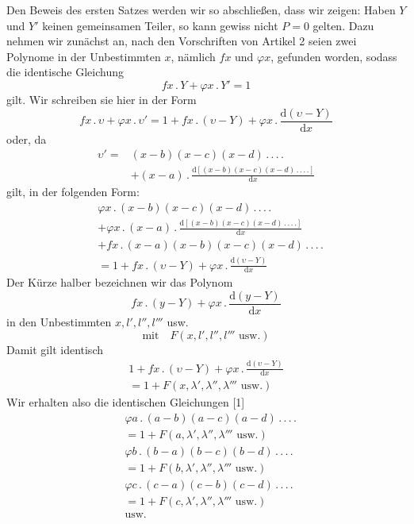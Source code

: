 Den Beweis des ersten Satzes werden wir so abschließen, dass wir zeigen: Haben $Y$ und $Y'$ keinen gemeinsamen Teiler, so kann gewiss nicht $P=0$ gelten. Dazu nehmen wir zunächst an, nach den Vorschriften von Artikel 2 seien zwei Polynome in der Unbestimmten $x$, nämlich $fx$ und $\varphi x$, gefunden worden, sodass die identische Gleichung
\[
fx\, .\,Y+\varphi x\, .\,Y'=1
\]
gilt. Wir schreiben sie hier in der Form
\[
fx\, .\,\upsilon+\varphi x\, .\,\upsilon'=1+fx\, .\,(\upsilon-Y)+\varphi x\, .\,\frac{\mathrm d(\upsilon-Y)}{\mathrm dx}
\]
oder, da
\[
\begin{aligned}
\upsilon'={}&(x-b)(x-c)(x-d)\, .\, .\, .\, .\\
&+(x-a)\, .\,\frac{\mathrm d[(x-b)(x-c)(x-d)\, .\, .\, .\, .]}{\mathrm dx}
\end{aligned}
\]
gilt, in der folgenden Form:
\[
\begin{aligned}
&\varphi x\, .\,(x-b)(x-c)(x-d)\, .\, .\, .\, .\\
&+\varphi x\, .\,(x-a)\, .\,\frac{\mathrm d[(x-b)(x-c)(x-d)\, .\, .\, .\, .]}{\mathrm dx}\\
&+fx\, .\,(x-a)(x-b)(x-c)(x-d)\, .\, .\, .\, .\\&=1+fx\, .\,(\upsilon-Y)+\varphi x\, .\,\frac{\mathrm d(\upsilon-Y)}{\mathrm dx}
\end{aligned}
\]
Der Kürze halber bezeichnen wir das Polynom
\[
fx\, .\,(y-Y)+\varphi x\, .\,\frac{\mathrm d(y-Y)}{\mathrm dx}
\]
in den Unbestimmten $x,l',l'',l'''$ usw.
\[
\text{mit}\quad F(x,l',l'',l'''\text{ usw.})
\]
Damit gilt identisch
\[
\begin{gathered}1+fx\, .\,(\upsilon-Y)+\varphi x\, .\,\frac{\mathrm d(\upsilon-Y)}{\mathrm dx}\\=1+F(x,\lambda',\lambda'',\lambda'''\text{ usw.})\end{gathered}
\]
Wir erhalten also die identischen Gleichungen [1]
\[
\begin{aligned}
&\varphi a\, .\,(a-b)(a-c)(a-d)\, .\, .\, .\, .\\&=1+F(a,\lambda',\lambda'',\lambda'''\text{ usw.})\\
&\varphi b\, .\,(b-a)(b-c)(b-d)\, .\, .\, .\, .\\&=1+F(b,\lambda',\lambda'',\lambda'''\text{ usw.})\\
&\varphi c\, .\,(c-a)(c-b)(c-d)\, .\, .\, .\, .\\&=1+F(c,\lambda',\lambda'',\lambda'''\text{ usw.})\\
&\text{usw.}
\end{aligned}
\]
